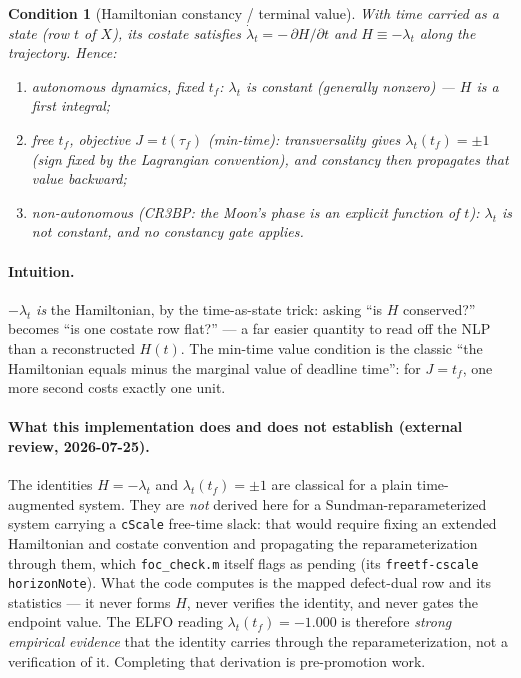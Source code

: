 \documentclass[11pt]{article}
\newcommand{\Ham}{H}
\newcommand{\file}[1]{\texttt{#1}}
\newcommand{\code}[1]{\texttt{#1}}
\newtheorem{condition}{Condition}
\begin{document}
\begin{condition}[Hamiltonian constancy / terminal value]
With time carried as a state (row $t$ of $X$), its costate satisfies
$\dot\lambda_t = -\,\partial\Ham/\partial t$ and $\Ham \equiv -\lambda_t$
along the trajectory. Hence:
\begin{enumerate}[label=(\roman*),nosep]
\item autonomous dynamics, fixed $t_f$: $\lambda_t$ is \emph{constant}
      (generally nonzero) --- $\Ham$ is a first integral;
\item free $t_f$, objective $J=t(\tau_f)$ (min-time): transversality gives
      $\lambda_t(t_f) = \pm 1$ (sign fixed by the Lagrangian convention), and
      constancy then propagates that value backward;
\item non-autonomous (CR3BP: the Moon's phase is an explicit function of
      $t$): $\lambda_t$ is \emph{not} constant, and no constancy gate applies.
\end{enumerate}
\end{condition}

\paragraph{Intuition.}
$-\lambda_t$ \emph{is} the Hamiltonian, by the time-as-state trick: asking
``is $\Ham$ conserved?'' becomes ``is one costate row flat?'' --- a far easier
quantity to read off the NLP than a reconstructed $\Ham(t)$. The min-time
value condition is the classic ``the Hamiltonian equals minus the marginal
value of deadline time'': for $J=t_f$, one more second costs exactly one unit.

\paragraph{What this implementation does and does not establish
(external review, 2026-07-25).}
The identities $\Ham=-\lambda_t$ and $\lambda_t(t_f)=\pm1$ are classical for a
plain time-augmented system. They are \emph{not} derived here for a
Sundman-reparameterized system carrying a \code{cScale} free-time slack: that
would require fixing an extended Hamiltonian and costate convention and
propagating the reparameterization through them, which \file{foc\_check.m}
itself flags as pending (its \code{freetf-cscale} \code{horizonNote}). What
the code computes is the mapped defect-dual row and its statistics --- it never
forms $\Ham$, never verifies the identity, and never gates the endpoint value.
The ELFO reading $\lambda_t(t_f)=-1.000$ is therefore \emph{strong empirical
evidence} that the identity carries through the reparameterization, not a
verification of it. Completing that derivation is pre-promotion work.
\end{document}
